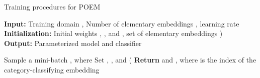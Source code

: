 \documentclass[letterpaper]{article} \usepackage{aaai23}  \usepackage{times}  \usepackage{helvet}  \usepackage{courier}  \usepackage[hyphens]{url}  \usepackage{graphicx} \urlstyle{rm} \def\UrlFont{\rm}  \usepackage{natbib}  \usepackage{caption} \frenchspacing  \setlength{\pdfpagewidth}{8.5in}  \setlength{\pdfpageheight}{11in}  \usepackage[labelsep=period]{caption}
\begin{document}
\newcommand{\factorial}{\ensuremath{\mbox{\sc Factorial}}}
\begin{algorithm}
	\caption{Training procedures for POEM}\label{euclid}
	\textbf{Input:} Training domain , Number of elementary embeddings , learning rate  \\
	\textbf{Initialization:} Initial weights , , and , set of elementary embeddings )  \\
	\textbf{Output:} Parameterized model  and classifier 
	\begin{algorithmic}[1]
		\For{}
		\State Sample a mini-batch , where 
		\For{} 
		\State Set , , and 
		\For{}
		\State  {}
		\State  {}
		\For{}
		\If{}
		\State  {}
		\EndIf
		\EndFor
		\EndFor
		\EndFor
		\State  
		\State (
		\EndFor
		\State \textbf{Return}  and , where  is the index of the category-classifying embedding
	\end{algorithmic}
	\label{alg:POEM}
\end{algorithm}
\end{document}
